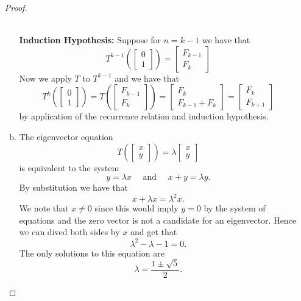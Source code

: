 \documentclass[12pt,letterpaper]{article}
\theoremstyle{plain}
\theoremstyle{definition}
\begin{document}
\begin{enumerate}[1.]
\begin{proof}
\begin{enumerate}[(a)]
\ \\
 {\bf Induction Hypothesis: }Suppose for $n=k-1$ we have that 
 \[T^{k-1}\left(\left[\begin{array}{c}0\\1\end{array}\right]\right)=\left[\begin{array}{c}F_{k-1}\\F_{k}\end{array}\right]\]
 Now we apply $T$ to $T^{k-1}$ and we have that 
 \[T^{k}\left(\left[\begin{array}{c}0\\1\end{array}\right]\right)=T\left(\left[\begin{array}{c}F_{k-1}\\F_{k}\end{array}\right]\right)=\left[\begin{array}{c}F_{k}\\F_{k-1}+F_k\end{array}\right]=\left[\begin{array}{c}F_{k}\\F_{k+1}\end{array}\right]\]
by application of the recurrence relation and induction hypothesis.
\item The eigenvector equation 
\[T \left( \left[\begin{array}{c}x\\y\end{array}\right]\right)=\lambda\left[\begin{array}{cc}x\\ y\end{array}\right]\]
is equivalent to the system 
\[y=\lambda x \quad \text{ and }\quad x+y=\lambda y.\]
By substitution we have that 
\[x+\lambda x=\lambda^2x.\]
We note that $x\neq 0$ since this would imply $y=0$ by the system of equations and the zero vector is not a candidate for an eigenvector. Hence we can dived both sides by $x$ and get that 
\[\lambda^2-\lambda -1=0.\]
The only solutions to this equation are 
\[\lambda=\frac{1\pm \sqrt{5}}{2}.\]


\end{enumerate}
\end{proof}
\end{enumerate}
\end{document}
